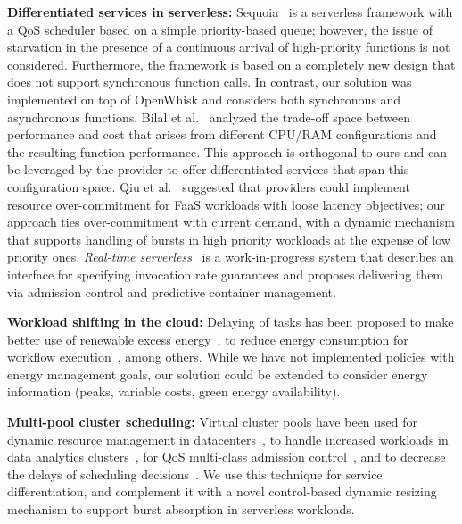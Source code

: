 \noindent\textbf{Differentiated services in serverless:}
Sequoia~\cite{Tariq:SOCC:2020:Sequoia} is a serverless framework with a QoS scheduler based on a simple priority-based queue; however, the issue of starvation in the presence of a continuous arrival of high-priority functions is not considered.
Furthermore, the framework is based on a completely new design that does not support synchronous function calls.
In contrast, our solution was implemented on top of OpenWhisk and considers both synchronous and asynchronous functions.
Bilal et al.~\cite{Bilal:CoRR:2021:GreatFreedom} analyzed the trade-off space between performance and cost that arises from different CPU/RAM configurations and the resulting function performance.
This approach is orthogonal to ours and can be leveraged by the provider to offer differentiated services that span this configuration space.
Qiu et al.~\cite{Qiu:WOSC:2021:LatencyCritical} suggested that providers could implement resource over-commitment for FaaS workloads with loose latency objectives;
our approach ties over-commitment with current demand, with a dynamic mechanism that supports handling of bursts in high priority workloads at the expense of low priority ones.
\emph{Real-time serverless}~\cite{Nguyen:WoSC:2019:Real-Time} is a work-in-progress system that describes an interface for specifying invocation rate guarantees and proposes delivering them via admission control and predictive container management.

\noindent\textbf{Workload shifting in the cloud:}
Delaying of tasks has been proposed to make better use of renewable excess energy~\cite{Wiesner:Middleware:2021:TemporalShifting,Wiesner:EuroPar:2022:Cucumber}, to reduce
energy consumption for workflow execution~\cite{Versluis:HotCloudPerf:2022:TaskFlow}, among others.
While we have not implemented policies with energy management goals, our solution could be extended to consider energy information (peaks, variable costs, green energy availability).

\noindent\textbf{Multi-pool cluster scheduling:}
Virtual cluster pools have been used for dynamic resource management in datacenters~\cite{Chase:HPDC:2003:COD}, to handle increased workloads in data analytics clusters~\cite{Lee:HotCloud:2011:Heterogeneity-Aware}, for QoS multi-class admission control~\cite{Delimitrou:ICAC:2013:ARQ}, and to decrease the delays of scheduling decisions~\cite{Singhvi:SoCC:2021:Atoll}. 
We use this technique for service differentiation, and complement it with a novel control-based dynamic resizing mechanism to support burst absorption in  serverless workloads.

